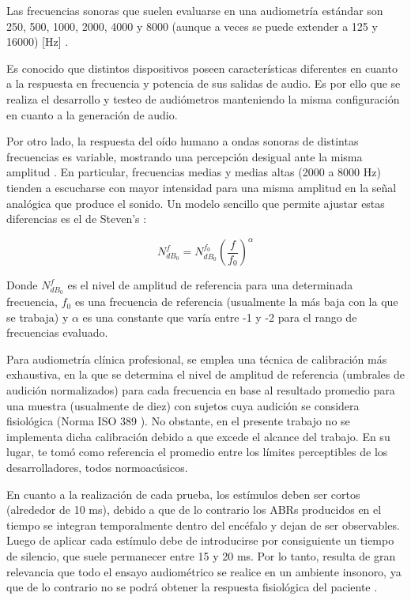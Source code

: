 Las frecuencias sonoras que suelen evaluarse en una audiometría estándar son 250, 500, 1000, 2000, 4000 y 8000 (aunque a veces se puede extender a 125 y 16000) [Hz] \cite{Cognifit}. 

Es conocido que distintos dispositivos poseen características diferentes en cuanto a la respuesta en frecuencia y potencia de sus salidas de audio. Es por ello que se realiza el desarrollo y testeo de audiómetros manteniendo la misma configuración en cuanto a la generación de audio. 

Por otro lado, la respuesta del oído humano a ondas sonoras de distintas frecuencias es variable, mostrando una percepción desigual ante la misma amplitud \cite{Fechner}. En particular, frecuencias medias y medias altas (2000 a 8000 Hz) tienden a escucharse con mayor intensidad para una misma amplitud en la señal analógica que produce el sonido. Un modelo sencillo que permite ajustar estas diferencias es el de Steven's \cite{Fechner}:

\begin{equation}
N_{dB_0}^f = N_{dB_0}^{f_0} \left(\frac{f}{f_0}\right) ^ \alpha
\label{eq:equivalent_sound_intensity}
\end{equation}

Donde $N_{dB_0}^f$ es el nivel de amplitud de referencia para una determinada frecuencia, $f_0$ es una frecuencia de referencia (usualmente la más baja con la que se trabaja) y $\alpha$ es una constante que varía entre -1 y -2 para el rango de frecuencias evaluado.

Para audiometría clínica profesional, se emplea una técnica de calibración más exhaustiva, en la que se determina el nivel de amplitud de referencia (umbrales de audición normalizados) para cada frecuencia en base al resultado promedio para una muestra (usualmente de diez) con sujetos cuya audición se considera fisiológica (Norma ISO 389 \cite{ISO389}). No obstante, en el presente trabajo no se implementa dicha calibración debido a que excede el alcance del trabajo. En su lugar, te tomó como referencia el promedio entre los límites perceptibles de los desarrolladores, todos normoacúsicos.

En cuanto a la realización de cada prueba, los estímulos deben ser cortos (alrededor de 10 ms), debido a que de lo contrario los ABRs producidos en el tiempo se integran temporalmente dentro del encéfalo y dejan de ser observables. Luego de aplicar cada estímulo debe de introducirse por consiguiente un tiempo de silencio, que suele permanecer entre 15 y 20 ms. Por lo tanto, resulta de gran relevancia que todo el ensayo audiométrico se realice en un ambiente insonoro, ya que de lo contrario no se podrá obtener la respuesta fisiológica del paciente \cite{funasaka-1986}.